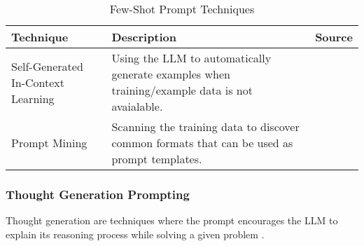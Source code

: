 \begin{table}[h!]
    \centering
    \begin{tabular}{p{3cm} p{8cm} p{2cm}}
        \toprule
        \textbf{Technique} & \textbf{Description} & \textbf{Source} \\
        \midrule
        \raggedright
        Self-Generated In-Context Learning & Using the LLM to automatically generate examples when training/example data is not avaialable. & \textcite{self-generating} \\
        \hline
        \raggedright
        Prompt Mining & Scanning the training data to discover common formats that can be used as prompt templates. & \textcite{mining} \\
        \bottomrule
    \end{tabular}
    \caption{Few-Shot Prompt Techniques}\label{tab:few_shot}
\end{table}

\FloatBarrier{}

\subsubsection{Thought Generation Prompting}

Thought generation are techniques where the prompt encourages the LLM to explain its reasoning process while solving a given problem \parencite{prompt1}.

